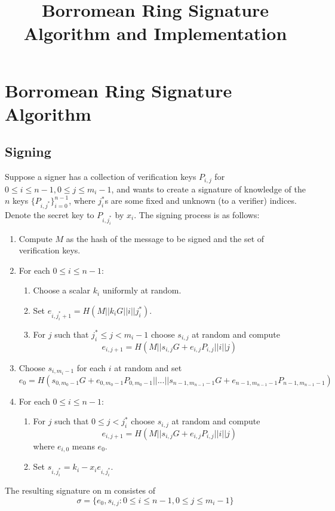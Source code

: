 \documentclass{llncs}
\title{Borromean Ring Signature Algorithm and Implementation}
\date{}
\begin{document}
\maketitle

\section{Borromean Ring Signature Algorithm}
\subsection{Signing}
Suppose a signer has a collection of verification keys $P_{i,j}$ for $0\le i \le n-1, 0\le j\le m_i-1$, and wants to create a signature of knowledge of the $n$ keys $\{P_{i,j^*}\}^{n-1}_{i=0}$, where $j^*_i$s are some fixed and unknown (to a verifier) indices. Denote the secret key to $P_{i,j^*_i}$ by $x_i$. The signing process is as follows:
\begin{enumerate}
\item Compute $M$ as the hash of the message to be signed and the set of verification keys.
\item For each $0\le i \le n-1$:
\begin{enumerate}
\item Choose a scalar $k_i$ uniformly at random.
\item Set $e_{i,j^*_i+1}=H(M||k_iG||i||j^*_i)$.
\item For $j$ such that $j^*_i\le j <m_i-1$ choose $s_{i,j}$ at random and compute
$$
e_{i,j+1}=H(M||s_{i,j}G+e_{i,j}P_{i,j}||i||j) \label{eq1}
$$
\end{enumerate}
\item Choose $s_{i,m_i-1}$ for each $i$ at random and set 
$$
e_0=H(s_{0,m_0-1}G+e_{0,m_0-1}P_{0,m_0-1}||...||s_{n-1,m_{n-1}-1}G+e_{n-1,m_{n-1}-1}P_{n-1,m_{n-1}-1})
$$
\item For each $0 \le i \le n-1$:
\begin{enumerate}
\item For $j$ such that $0\le j<j^*_i$ choose $s_{i,j}$ at random and compute
$$
e_{i,j+1}=H(M||s_{i,j}G+e_{i,j}P_{i,j}||i||j)
$$
where $e_{i,0}$ means $e_0$.
\item Set $s_{i,j^*_i}=k_i-x_ie_{i,j^*_i}$.
\end{enumerate}
\end{enumerate}
The resulting signature on m consistes of 
$$
\sigma = \{e_0, s_{i,j}: 0\le i\le n-1, 0\le j\le m_i-1\}
$$
\end{document}
